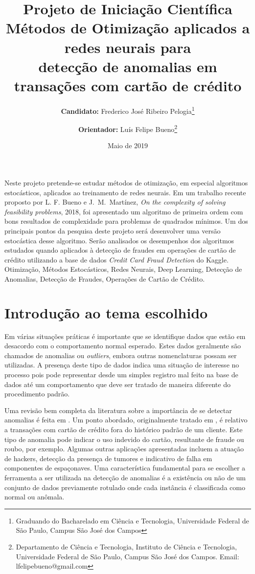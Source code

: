 \documentclass[a4paper,12pt]{article}
\title{\textbf{Projeto de Iniciação Científica} \\
Métodos de Otimização aplicados a redes neurais para \\ detecção de anomalias em transações com cartão de crédito}
\author{\textbf{Candidato:} Frederico José Ribeiro Pelogia\thanks{Graduando do Bacharelado em Ciência e Tecnologia,  Universidade Federal de São Paulo,
Campus  São José dos Campos}
\and  
\textbf{Orientador:} Luís Felipe Bueno\thanks{Departamento de Ciência e Tecnologia, Instituto de Ciência e Tecnologia,  Universidade Federal de
 São Paulo, Campus  São José dos Campos. Email: lfelipebueno@gmail.com}}
\date{Maio de 2019}
\begin{document}
	

	
\maketitle

\abstract Neste projeto pretende-se estudar métodos de otimização, em especial algoritmos estocásticos, aplicados ao treinamento de redes neurais. Em um trabalho recente proposto por L. F. Bueno e J.~M.~Martínez, \textit{On the complexity of solving feasibility problems}, 2018, foi apresentado um algoritmo de primeira ordem com bons resultados de complexidade para problemas de quadrados mínimos. Um  dos principais pontos da pesquisa deste projeto será desenvolver uma versão estocástica desse algoritmo.  Serão analisados os desempenhos dos algoritmos estudados quando aplicados à detecção de fraudes em operações de cartão de crédito utilizando a base de dados \textit{Credit Card Fraud Detection} do  Kaggle.  \\



 {Otimização, Métodos Estocásticos, Redes Neurais, Deep Learning, Detecção de Anomalias, Detecção de Fraudes, Operações de Cartão de Crédito.}






\section{Introdução ao tema escolhido}



Em várias situações práticas é importante que se identifique dados que estão em desacordo com o comportamento normal esperado. Estes dados geralmente são chamados de anomalias ou \textit{outliers}, embora outras nomenclaturas possam ser utilizadas. A presença deste tipo de dados indica uma situação de interesse no processo pois pode representar desde um simples registro mal feito na base de dados até um comportamento que deve ser tratado de maneira diferente do procedimento padrão. 

Uma revisão bem completa da literatura sobre a importância de se detectar anomalias é feita em \cite{Chandola:2009}. Um ponto abordado, originalmente tratado em   \cite{Aleskerov97}, é relativo a transações com cartão de crédito fora do histórico padrão de um cliente. Este tipo de anomalia pode indicar o uso indevido do cartão, resultante de fraude ou roubo, por exemplo. Algumas outras aplicações apresentadas incluem a atuação de hackers, detecção da presença de tumores e indicativo de falha em componentes de  espaçonaves.  Uma característica fundamental para se escolher a ferramenta a ser utilizada na detecção de anomalias é a existência ou não de um conjunto de dados previamente rotulado onde cada instância é classificada como normal ou anômala. 
\end{document}
